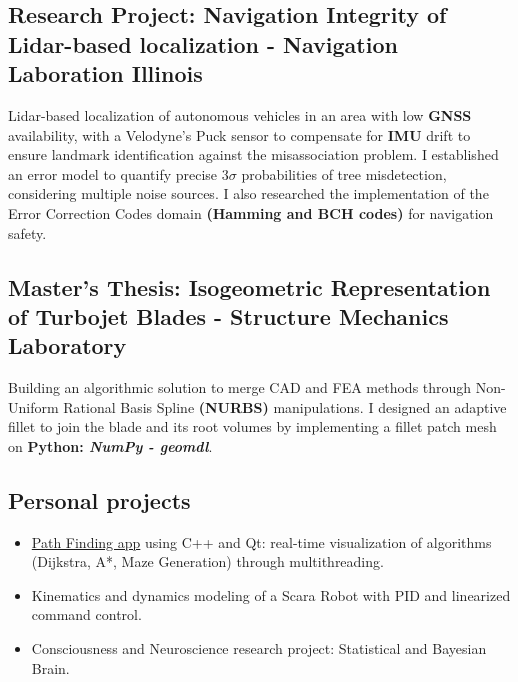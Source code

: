 \documentclass[]{article}
\begin{document}
\subsection{Research Project: Navigation Integrity of Lidar-based localization - Navigation Laboration Illinois}
Lidar-based localization of autonomous vehicles in an area with low \textbf{GNSS} availability, with a Velodyne's Puck sensor to compensate for \textbf{IMU} drift to ensure landmark identification against the misassociation problem.
I established an error model to quantify precise $3\sigma $ probabilities of tree misdetection, considering multiple noise sources. 
I also researched the implementation of the Error Correction Codes domain \textbf{(Hamming and BCH codes)} for navigation safety.\\


\subsection{Master's Thesis: Isogeometric Representation of Turbojet Blades - Structure Mechanics Laboratory}
Building an algorithmic solution to merge CAD and FEA methods through Non-Uniform Rational Basis Spline \textbf{(NURBS)} manipulations. 
I designed an adaptive fillet to join the blade and its root volumes by implementing a fillet patch mesh on \textbf{Python: \textit{NumPy - geomdl}}.

\vspace{1ex}

\subsection{Personal projects}
\begin{itemize}
    \item \href{https://github.com/NathanTouboul/PathPlanning}{Path Finding app}  using C++ and Qt: real-time visualization of algorithms (Dijkstra, A*, Maze Generation) through multithreading.
    \item Kinematics and dynamics modeling of a Scara Robot with PID and linearized command control.
    \item Consciousness and Neuroscience research project: Statistical and Bayesian Brain.
\end{itemize}
\end{document}
